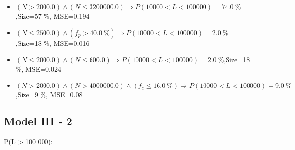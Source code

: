 \documentclass[numbered]{CSL}
\begin{document}
\begin{itemize}
\item $(N > 2000.0) \land (N \leq 3200000.0) \Rightarrow P(10 000 < L < 100 000) = 74.0~\%$,\hfill Size=57 \%, MSE=0.194
\item $(N \leq 2500.0) \land (f_p > 40.0~\%) \Rightarrow P(10 000 < L < 100 000) = 2.0~\%$,\hfill Size=18 \%, MSE=0.016
\item $(N \leq 2000.0) \land (N \leq 600.0) \Rightarrow P(10 000 < L < 100 000) = 2.0~\%$,\hfill Size=18 \%, MSE=0.024
\item $(N > 2000.0) \land (N > 4000000.0) \land (f_c \leq 16.0~\%) \Rightarrow P(10 000 < L < 100 000) = 9.0~\%$,\hfill Size=9 \%, MSE=0.08
\end{itemize}

\subsection{Model III - 2}
P(L > 100 000):
\end{document}
